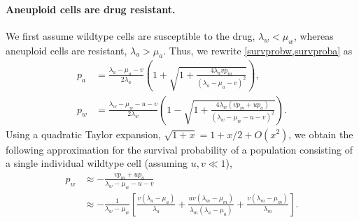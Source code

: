 \documentclass[12pt]{extarticle}
\begin{document}
\paragraph{Aneuploid cells are drug resistant.} 
We first assume wildtype cells are susceptible to the drug, $\lambda_w<\mu_w$, whereas aneuploid cells are resistant, $\lambda_a>\mu_a$.
Thus, we rewrite \cref{survprobw,survproba} as
\begin{align*}
p_a&=\frac{\lambda_a-\mu_a-v}{2\lambda_a}\left(1+\sqrt{1+\frac{4\lambda_avp_m}{\left(\lambda_a-\mu_a-v\right)^2}}\right),\\
p_w&=\frac{\lambda_w-\mu_w-u-v}{2\lambda_w}\left(1-\sqrt{1+\frac{4\lambda_w\left(vp_m+up_a\right)}{\left(\lambda_w-\mu_w-u-v\right)^2}}\right).
\end{align*}
Using a quadratic Taylor expansion, $\sqrt{1+x}=1+x/2+O(x^2)$, 
we obtain the following approximation for the survival probability of a population consisting of a single individual wildtype cell (assuming $u,v \ll 1$),
\begin{align}\label{survprobwinitial}
p_w 
&\approx -\frac{vp_m+up_a}{\lambda_w-\mu_w-u-v}\\
\nonumber
&\approx-\frac{1}{\lambda_w-\mu_w}\left[\frac{v\left(\lambda_a-\mu_a\right)}{\lambda_a}+\frac{uv\left(\lambda_m-\mu_m\right)}{\lambda_m\left(\lambda_a-\mu_a\right)}+\frac{v\left(\lambda_m-\mu_m\right)}{\lambda_m}\right].
\end{align}
\end{document}
